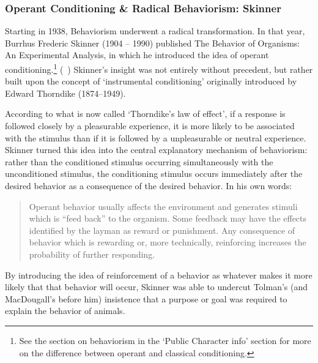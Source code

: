 \begin{refsection}
\subsubsection{Operant Conditioning \& Radical Behaviorism: Skinner}
\label{operantconditioningradicalbehaviorism:skinner}

Starting in 1938, Behaviorism underwent a radical transformation. In that year, Burrhus Frederic Skinner (1904 – 1990) published The Behavior of Organisms: An Experimental Analysis, in which he introduced the idea of operant conditioning.\footnote{See the section on behaviorism in the `Public Character info' section for more on the difference between operant and classical conditioning.} (~\citep{Anonymous:Auva_WZ2}) Skinner's insight was not entirely without precedent, but rather built upon the concept of `instrumental conditioning' originally introduced by Edward Thorndike (1874--1949). 

According to what is now called `Thorndike's law of effect', if a response is followed closely by a pleasurable experience, it is more likely to be associated with the stimulus than if it is followed by a unpleasurable or neutral experience. Skinner turned this idea into the central explanatory mechanism of behaviorism: rather than the conditioned stimulus occurring simultaneously with the unconditioned stimulus, the conditioning stimulus occurs immediately after the desired behavior as a consequence of the desired behavior. In his own words:

\begin{quote}

Operant behavior usually affects the environment and generates stimuli which is “feed back” to the organism. Some feedback may have the effects identified by the layman as reward or punishment. Any consequence of behavior which is rewarding or, more technically, reinforcing increases the probability of further responding. ~\citep[p. 129]{Skinner:1972wq}
\end{quote}

By introducing the idea of reinforcement of a behavior as whatever makes it more likely that that behavior will occur, Skinner was able to undercut Tolman's (and MacDougall's before him) insistence that a purpose or goal was required to explain the behavior of animals.


\end{refsection}
